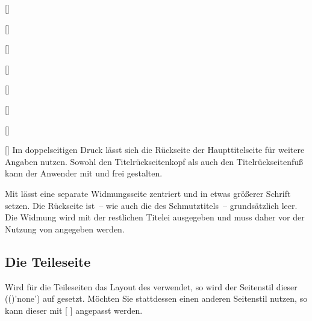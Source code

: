 \begin{Declaration*}{}
\begin{Declaration*}{}
\begin{Declaration*}{}
\begin{Bundle}{}
\begin{Declaration}{[]}
\begin{Declaration}{[]}
\begin{Declaration}{[]}
\begin{Declaration}{[]}
\begin{Declaration}{[]}
\begin{Declaration}{[]}
\begin{Declaration}{[]}
\begin{Declaration}{[]}
%
Im doppelseitigen Druck lässt sich die Rückseite der Haupttitelseite für 
weitere Angaben nutzen. Sowohl den Titelrückseitenkopf als auch den
Titelrückseitenfuß kann der Anwender mit  und 
 frei gestalten.

Mit  lässt eine separate Widmungsseite zentriert und in etwas 
größerer Schrift setzen. Die Rückseite ist~-- wie auch die des Schmutztitels~-- 
grundsätzlich leer. Die Widmung wird mit der restlichen Titelei ausgegeben und 
muss daher vor der Nutzung von  angegeben werden.
%
\end{Declaration}
\end{Declaration}
\end{Declaration}
\end{Declaration}
\end{Declaration}
\end{Declaration}
\end{Declaration}
\end{Declaration}
\end{Bundle}

\subsection{Die Teileseite}
%
%
Wird für die Teileseiten das Layout des \CDs verwendet, so wird der Seitenstil 
dieser (()'none') auf 
 gesetzt. Möchten Sie stattdessen einen anderen 
Seitenstil nutzen, so kann dieser mit 
[%
]
angepasst werden.


\end{Declaration*}
\end{Declaration*}
\end{Declaration*}
